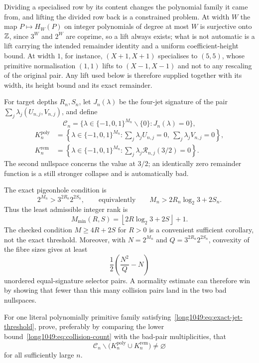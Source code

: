 \documentclass[11pt]{article}
\begin{document}
Dividing a specialised row by its content changes the polynomial family it came
from, and lifting the divided row back is a constrained problem.  At width $W$ the map $P\mapsto H_W(P)$ on integer polynomials of
degree at most $W$ is surjective onto $\mathbb{Z}$, since $3^{W}$ and $2^{W}$ are
coprime, so a lift always exists; what is not automatic is a lift carrying the
intended remainder identity and a uniform coefficient-height bound.  At width
$1$, for instance, $(X+1,X+1)$ specialises to $(5,5)$, whose primitive
normalisation $(1,1)$ lifts to $(X-1,X-1)$ and not to any rescaling of the
original pair.  Any lift used below is therefore supplied together with its
width, its height bound and its exact remainder.

For target depths $R_n,S_n$, let $J_n(\lambda)$ be the four-jet signature of
the pair $\sum_j\lambda_j(U_{n,j},V_{n,j})$, and define
\[
 \mathcal C_n=
 \{\lambda\in\{-1,0,1\}^{M_n}\mathbin{\backslash}\{0\}:J_n(\lambda)=0\},
\]
\[
\begin{aligned}
 K_n^{\mathrm{poly}}
   &=\left\{\lambda\in\{-1,0,1\}^{M_n}:
       \sum_j\lambda_jU_{n,j}=0,\ \sum_j\lambda_jV_{n,j}=0\right\},\\
 K_n^{\mathrm{rem}}
   &=\left\{\lambda\in\{-1,0,1\}^{M_n}:
       \sum_j\lambda_j\mathcal R_{n,j}(3/2)=0\right\}.
\end{aligned}
\]
The second nullspace concerns the value at $3/2$; an identically zero
remainder function is a still stronger collapse and is automatically bad.

The exact pigeonhole condition is
\[
 2^{M_n}>3^{2R_n}2^{2S_n},
 \qquad\text{equivalently}\qquad
 M_n>2R_n\log_2 3+2S_n.
\tag{8.1}\label{long1049:eq:exact-jet-threshold}
\]
Thus the least admissible integer rank is
\[
 M_{\min}(R,S)=
 \left\lfloor2R\log_2 3+2S\right\rfloor+1.
\]
The checked condition $M\ge4R+2S$ for $R>0$ is a convenient sufficient
corollary, not the exact threshold.  Moreover, with
$N=2^{M_n}$ and $Q=3^{2R_n}2^{2S_n}$, convexity of the fibre sizes gives at
least
\[
 \frac12\left(\frac{N^2}{Q}-N\right)
\tag{8.2}\label{long1049:eq:collision-count}
\]
unordered equal-signature selector pairs.  A normality estimate can therefore
win by showing that fewer than this many collision pairs land in the two bad
nullspaces.

\begin{problem}\label{long1049:prob:escape}
For one literal polynomially primitive family
satisfying~\eqref{long1049:eq:exact-jet-threshold},
prove, preferably by comparing the lower bound~\eqref{long1049:eq:collision-count} with
the bad-pair multiplicities, that
\[
 \mathcal C_n\mathbin{\backslash}
 \bigl(K_n^{\mathrm{poly}}\cup K_n^{\mathrm{rem}}\bigr)
 \ne\varnothing
\]
for all sufficiently large $n$.
\end{problem}
\end{document}
